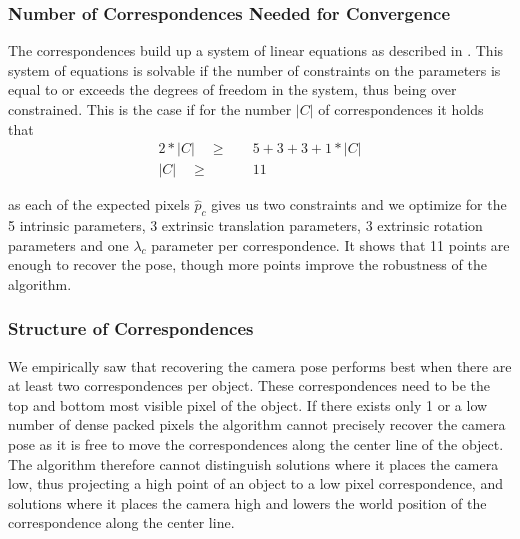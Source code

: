 \subsubsection{Number of Correspondences Needed for Convergence}
\label{sec:static_calibration_number_points}
The correspondences build up a system of linear equations as described in .
This system of equations is solvable if the number of constraints on the parameters is equal to or exceeds the degrees of freedom in the system, thus being over constrained.
This is the case if for the number $\left\lvert C \right\rvert$ of correspondences it holds that
\begin{equation}
  \begin{split}
  2 * \left\lvert C \right\rvert \quad \geq& \quad 5 + 3 + 3 + 1 * \left\lvert C \right\rvert \\
  \left\lvert C \right\rvert \quad \geq& \quad 11 
\end{split}
\end{equation} 

as each of the expected pixels $\hat{p}_c$ gives us two constraints and we optimize for the 5 intrinsic parameters, 3 extrinsic translation parameters, 3 extrinsic rotation parameters and one $\lambda_c$ parameter per correspondence.
It shows that 11 points are enough to recover the pose, though more points improve the robustness of the algorithm.


\subsubsection{Structure of Correspondences}
We empirically saw that recovering the camera pose performs best when there are at least two correspondences per object.
These correspondences need to be the top and bottom most visible pixel of the object.
If there exists only 1 or a low number of dense packed pixels the algorithm cannot precisely recover the camera pose as it is free to move the correspondences along the center line of the object.
The algorithm therefore cannot distinguish solutions where it places the camera low, thus projecting a high point of an object to a low pixel correspondence, and solutions where it places the camera high and lowers the world position of the correspondence along the center line.

